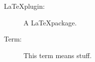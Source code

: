 

\label{fr:glossary}

\begin{description}

    \item[\LaTeX plugin:]\label{gloss:plugin} A \LaTeX package.
    \item[Term:]\label{gloss:term} This term means stuff.

\end{description}

